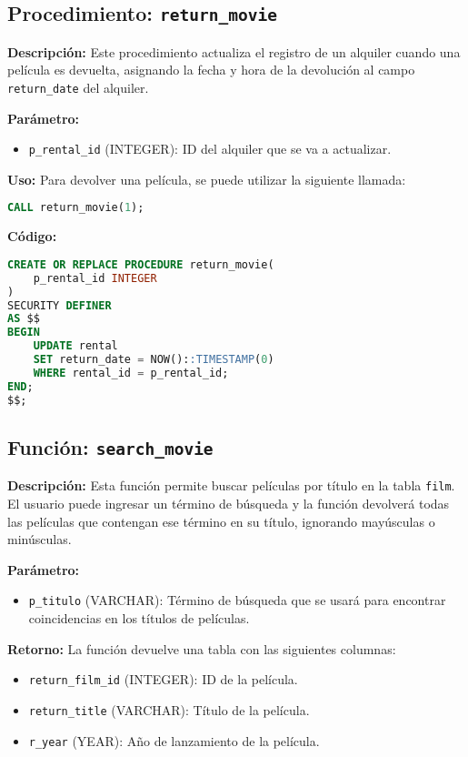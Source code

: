 \documentclass{article}
\begin{document}
\subsection{Procedimiento: \texttt{return\_movie}}

\textbf{Descripción:}  
Este procedimiento actualiza el registro de un alquiler cuando una película es devuelta, asignando la fecha y hora de la devolución al campo \texttt{return\_date} del alquiler.

\textbf{Parámetro:}
\begin{itemize}
    \item \texttt{p\_rental\_id} (INTEGER): ID del alquiler que se va a actualizar.
\end{itemize}

\textbf{Uso:}
Para devolver una película, se puede utilizar la siguiente llamada:

\begin{lstlisting}[language=SQL]
CALL return_movie(1);
\end{lstlisting}

\textbf{Código:}
\begin{lstlisting}[language=SQL]
CREATE OR REPLACE PROCEDURE return_movie(
    p_rental_id INTEGER
) 
SECURITY DEFINER
AS $$
BEGIN
    UPDATE rental
    SET return_date = NOW()::TIMESTAMP(0) 
    WHERE rental_id = p_rental_id;
END;
$$;
\end{lstlisting}

\subsection{Función: \texttt{search\_movie}}

\textbf{Descripción:}  
Esta función permite buscar películas por título en la tabla \texttt{film}. El usuario puede ingresar un término de búsqueda y la función devolverá todas las películas que contengan ese término en su título, ignorando mayúsculas o minúsculas.

\textbf{Parámetro:}
\begin{itemize}
    \item \texttt{p\_titulo} (VARCHAR): Término de búsqueda que se usará para encontrar coincidencias en los títulos de películas.
\end{itemize}

\textbf{Retorno:}  
La función devuelve una tabla con las siguientes columnas:
\begin{itemize}
    \item \texttt{return\_film\_id} (INTEGER): ID de la película.
    \item \texttt{return\_title} (VARCHAR): Título de la película.
    \item \texttt{r\_year} (YEAR): Año de lanzamiento de la película.
\end{itemize}
\end{document}

